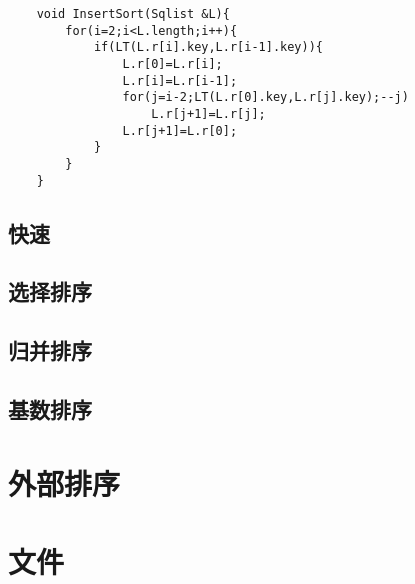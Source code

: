 \documentclass[UTF8]{ctexart}
\begin{document}
\begin{lstlisting}
    void InsertSort(Sqlist &L){
        for(i=2;i<L.length;i++){
            if(LT(L.r[i].key,L.r[i-1].key)){
                L.r[0]=L.r[i];
                L.r[i]=L.r[i-1];
                for(j=i-2;LT(L.r[0].key,L.r[j].key);--j)
                    L.r[j+1]=L.r[j];
                L.r[j+1]=L.r[0];
            }
        }
    }
\end{lstlisting}


\subsection{快速}
\subsection{选择排序}
\subsection{归并排序}
\subsection{基数排序}

\newpage
\section{外部排序}
\newpage
\section{文件}
\end{document}
